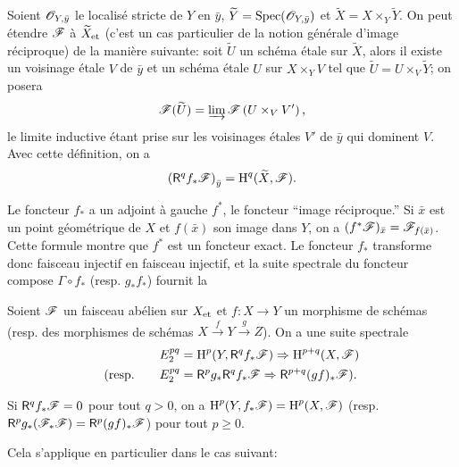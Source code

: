 \documentclass[oneside]{book}
\begin{document}
Soient $\mathscr{O}_{Y,\bar y}$ le localisé stricte de $Y$ en $\bar y$, 
$\widetilde Y=\operatorname{Spec}(\mathscr{O}_{Y,\bar y})$ et $\widetilde X=X\times_Y \widetilde Y$. 
On peut étendre $\mathscr{F}$ à ${\widetilde X}_{\textnormal{et}}$ (c'est un cas particulier de la 
notion générale d'image réciproque) de la manière suivante: soit 
$\widetilde U$ un schéma étale sur $\widetilde X$, alors il existe un 
voisinage étale $V$ de $\bar y$ et un schéma étale $U$ sur $X\times_Y V$ tel 
que $\widetilde U=U\times_V \widetilde Y$; on posera 
\[
  \mathscr{F}(\widetilde U)=\varinjlim \mathscr{F}\left(U\times_V V'\right)\text{,}
\]
le limite inductive étant prise sur les voisinages étales $V'$ de $\bar y$ qui 
dominent $V$. Avec cette définition, on a 
\[
  \left(\mathsf{R}^q f_* \mathscr{F}\right)_{\bar y} = \operatorname{H}^q(\widetilde X,\mathscr{F})\text{.}
\]

Le foncteur $f_*$ a un adjoint à gauche $f^*$, le foncteur ``image 
réciproque.'' Si $\bar x$ est un point géométrique de $X$ et $f(\bar x)$ son 
image dans $Y$, on a $(f^* \mathscr{F})_{\bar x} = \mathscr{F}_{f(\bar x)}$. Cette formule montre 
que $f^*$ est un foncteur exact. Le foncteur $f_*$ transforme donc faisceau 
injectif en faisceau injectif, et la suite spectrale du foncteur compose 
$\Gamma\circ f_*$ (resp. $g_* f_*$) fournit la 





\begin{theorem}\label{I:2-3-4}
Soient $\mathscr{F}$ un faisceau abélien sur ${X}_{\textnormal{et}}$ et $f:X\to Y$ un morphisme de 
schémas (resp. des morphismes de schémas $X\xrightarrow f Y \xrightarrow g Z$). 
On a une suite spectrale 
\begin{align*}
  E_2^{pq} &= \operatorname{H}^p(Y,\mathsf{R}^q f_* \mathscr{F}) \Rightarrow \operatorname{H}^{p+q}(X,\mathscr{F}) \\
  \text{(resp.}\qquad E_2^{pq} &= \mathsf{R}^p g_* \mathsf{R}^q f_* \mathscr{F} \Rightarrow \mathsf{R}^{p+q}(gf)_* \mathscr{F}\text{).}
\end{align*}
\end{theorem}





\begin{corollary}\label{I:2-3-5}
Si $\mathsf{R}^q f_* \mathscr{F}=0$ pour tout $q>0$, on a $\operatorname{H}^p(Y,f_* \mathscr{F})=\operatorname{H}^p(X,\mathscr{F})$ (resp. 
$\mathsf{R}^p g_*(\mathscr{F}_* \mathscr{F}) = \mathsf{R}^p(g f)_* \mathscr{F}$) pour tout $p\geqslant 0$. 
\end{corollary}

Cela s'applique en particulier dans le cas suivant:
\end{document}
